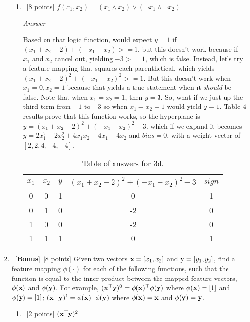 \documentclass[12pt, fullpage,letterpaper]{article}
\begin{document}
\begin{enumerate}
\begin{enumerate}
		\item ~[8 points] $f(x_1, x_2) = (x_1 \land x_2) \lor (\neg x_1 \land \neg x_2)$
		
		\emph{Answer}
		
		Based on that logic function, would expect $y=1$ if $(x_1+x_2-2)+(-x_1-x_2)>=1$, but this doesn't work because if $x_1$ and $x_2$ cancel out, yielding $-3>=1$, which is false. Instead, let's try a feature mapping that squares each parenthetical, which yields $(x_1+x_2-2)^2+(-x_1-x_2)^2>=1$. But this doesn't work when $x_1=0, x_2=1$ because that yields a true statement when it \emph{should} be false. Note that when $x_1=x_2=1$, then $y=3$. So, what if we just up the third term from $-1$ to $-3$ so when $x_1=x_2=1$ would yield $y=1$. Table 4 results prove that this function works, so the hyperplane is $y=(x_1+x_2-2)^2+(-x_1-x_2)^2-3$, which if we expand it becomes $y=2x_1^2+2x_2^2+4x_1x_2-4x_1-4x_2$ and $bias=0$, with a weight vector of $[2, 2, 4, -4, -4]$.
		
		\begin{table}
        	\centering
        	\begin{tabular}{cccc|c}
        		$x_1 $ & $x_2$ & $y$ & $(x_1+x_2-2)^2+(-x_1-x_2)^2-3$ & $sign$\\ 
        		\hline\hline
        		0 & 0 & 1 &  0 & 1 \\ \hline
        		0 & 1 & 0 & -2 & 0 \\ \hline
        		1 & 0 & 0 & -2 & 0 \\ \hline
        		1 & 1 & 1 &  0 & 1 \\ \hline
        	\end{tabular}
        	\caption{Table of answers for 3d.}\label{tb:1}
        \end{table}
	\end{enumerate}
		
	
	\item~[\textbf{Bonus}]~[8 points]  Given two vectors ${\bf x} = [x_1,  x_2]$ and ${\bf y}=[y_1,  y_2]$, find a feature mapping $\phi(\cdot)$ for each of the following functions, such that the function is equal to the inner product between the mapped feature vectors, $\phi({\bf x})$ and $\phi({\bf y})$. For example, $({\bf x}^\top {\bf y})^0 = \phi({\bf x})^\top \phi({\bf y})$ where $\phi({\bf x}) = [1]$ and $\phi({\bf y}) = [1]$; $({\bf x}^\top {\bf y})^1 = \phi({\bf x})^\top \phi({\bf y})$ where $\phi({\bf x}) = {\bf x}$ and $\phi({\bf y}) = {\bf y}$. 
	\begin{enumerate}
		\item~[2 points] $({\bf x}^\top {\bf y})^2$
		

\end{enumerate}
\end{enumerate}
\end{document}
